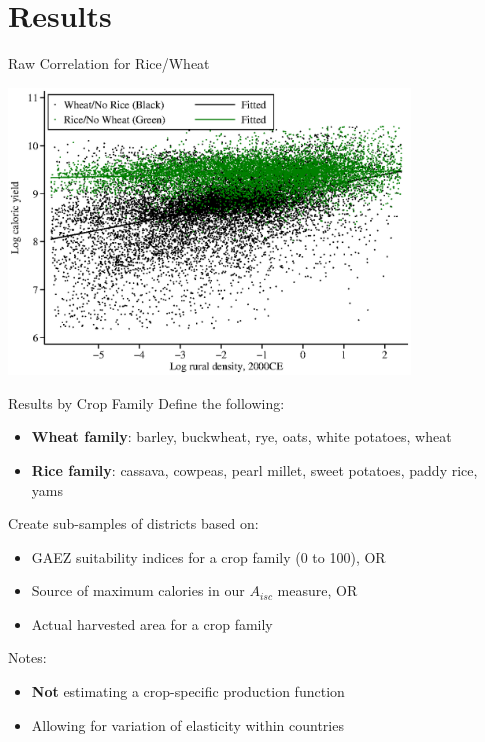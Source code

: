 \documentclass[10pt, xcolor=dvipsnames]{beamer}
\begin{document}
\section{Results}

\begin{frame}{Raw Correlation for Rice/Wheat}
\begin{center}
\includegraphics[width=0.8\textwidth]{fig_beta_crop.eps}
\end{center}
\end{frame}

\begin{frame}{Results by Crop Family}
Define the following:
\begin{itemize}
  \item \textbf{Wheat family}: barley, buckwheat, rye, oats, white potatoes, wheat
  \item \textbf{Rice family}: cassava, cowpeas, pearl millet, sweet potatoes, paddy rice, yams
\end{itemize}
Create sub-samples of districts based on: 
\begin{itemize}
  \item GAEZ suitability indices for a crop family (0 to 100), OR
  \item Source of maximum calories in our $A_{isc}$ measure, OR
  \item Actual harvested area for a crop family
\end{itemize}
Notes:
\begin{itemize}
  \item \textbf{Not} estimating a crop-specific production function
  \item Allowing for variation of elasticity within countries
\end{itemize}

\end{frame}
\end{document}
